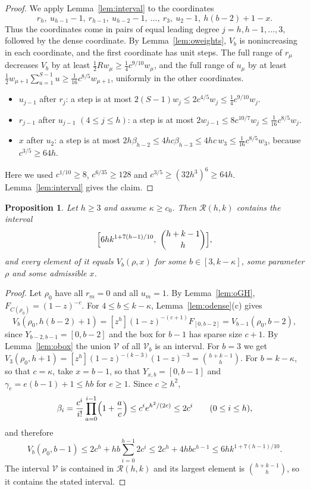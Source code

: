 \documentclass[11pt]{amsart}
\newtheorem{proposition}[theorem]{Proposition}
\theoremstyle{definition}
\theoremstyle{remark}
\numberwithin{equation}{section}
\newcommand{\R}{\mathcal{R}}
\newcommand{\coef}[1]{[z^{#1}]}
\begin{document}
\begin{proof}
We apply Lemma~\ref{lem:interval} to the coordinates
\[
r_h,\ u_{h-1}-1,\ r_{h-1},\ u_{h-2}-1,\ \dots,\ r_3,\ u_2-1,\ h(b-2)+1-x .
\]
Thus the coordinates come in pairs of equal leading degree $j=h,h-1,\dots,3$, followed by the dense coordinate. By Lemma~\ref{lem:oweights}, $V_b$ is nonincreasing in each coordinate, and the first coordinate has unit steps. The full range of $r_\mu$ decreases $V_b$ by at least $\frac12Rw_\mu\ge\frac14c^{9/10}w_\mu$, and the full range of $u_\mu$ by at least $\frac12w_{\mu+1}\sum_{u=1}^{S-1}u\ge\frac1{16}c^{8/5}w_{\mu+1}$, uniformly in the other coordinates.
\begin{itemize}[leftmargin=2em]
\item $u_{j-1}$ after $r_j$: a step is at most $2(S-1)w_j\le 2c^{4/5}w_j\le\frac14c^{9/10}w_j$.
\item $r_{j-1}$ after $u_{j-1}$ $(4\le j\le h)$: a step is at most $2w_{j-1}\le 8c^{10/7}w_j\le\frac1{16}c^{8/5}w_j$.
\item $x$ after $u_2$: a step is at most $2h\beta_{h-2}\le 4hc\beta_{h-3}\le 4hc\,w_3\le\frac1{16}c^{8/5}w_3$, because $c^{3/5}\ge 64h$.
\end{itemize}
Here we used $c^{1/10}\ge 8$, $c^{6/35}\ge128$ and $c^{3/5}\ge(32h^3)^6\ge 64h$. Lemma~\ref{lem:interval} gives the claim.
\end{proof}

\begin{proposition}\label{prop:olarge}
Let $h\ge 3$ and assume $\kappa\ge c_0$. Then $\R(h,k)$ contains the interval
\[
\Bigl[6hk^{1+7(h-1)/10},\ \binom{h+k-1}{h}\Bigr],
\]
and every element of it equals $V_b(\rho,x)$ for some $b\in[3,k-\kappa]$, some parameter $\rho$ and some admissible $x$.
\end{proposition}

\begin{proof}
Let $\rho_0$ have all $r_m=0$ and all $u_m=1$. By Lemma~\ref{lem:oGH}, $F_{C(\rho_0)}=(1-z)^{-c}$. For $4\le b\le k-\kappa$, Lemma~\ref{lem:odense}(c) gives
\[
V_b(\rho_0,h(b-2)+1)=\coef h(1-z)^{-(c+1)}F_{[0,b-2]}=V_{b-1}(\rho_0,b-2),
\]
since $Y_{b-2,b-1}=[0,b-2]$ and the box for $b-1$ has sparse size $c+1$. By Lemma~\ref{lem:obox} the union $\mathcal V$ of all $\mathcal V_b$ is an interval. For $b=3$ we get $V_3(\rho_0,h+1)=\coef h(1-z)^{-(k-3)}(1-z)^{-3}=\binom{h+k-1}{h}$. For $b=k-\kappa$, so that $c=\kappa$, take $x=b-1$, so that $Y_{x,b}=[0,b-1]$ and $\gamma_e=e(b-1)+1\le hb$ for $e\ge 1$. Since $c\ge h^2$,
\[
\beta_i=\frac{c^i}{i!}\prod_{a=0}^{i-1}\Bigl(1+\frac ac\Bigr)\le c^ie^{h^2/(2c)}\le 2c^i\qquad(0\le i\le h),
\]
and therefore
\[
V_b(\rho_0,b-1)\le 2c^h+hb\sum_{i=0}^{h-1}2c^i\le 2c^h+4hbc^{h-1}\le 6hk^{1+7(h-1)/10}.
\]
The interval $\mathcal V$ is contained in $\R(h,k)$ and its largest element is $\binom{h+k-1}h$, so it contains the stated interval.
\end{proof}
\end{document}
